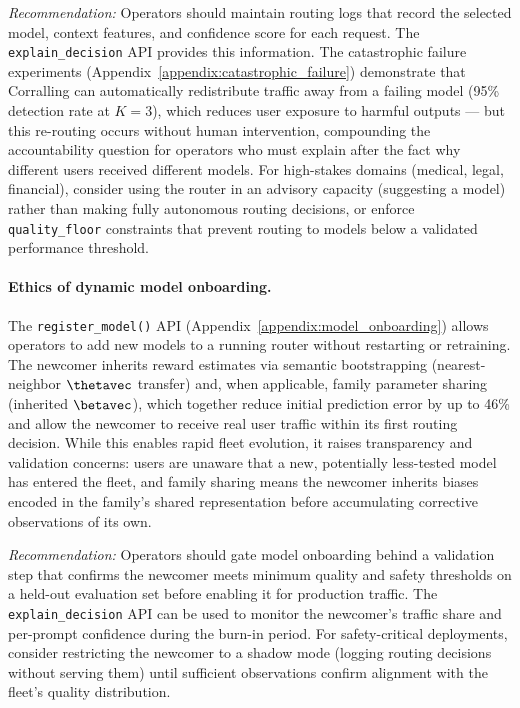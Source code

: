 \emph{Recommendation:}  Operators should maintain routing logs that record
the selected model, context features, and confidence score for each
request.  The \texttt{explain\_decision} API provides this information.
The catastrophic failure experiments
(Appendix~\ref{appendix:catastrophic_failure}) demonstrate that Corralling
can automatically redistribute traffic away from a failing model (95\%
detection rate at $K{=}3$), which reduces user exposure to harmful
outputs --- but this re-routing occurs without human intervention,
compounding the accountability question for operators who must explain
after the fact why different users received different models.
For high-stakes domains (medical, legal, financial), consider using the
router in an advisory capacity (suggesting a model) rather than making
fully autonomous routing decisions, or enforce \texttt{quality\_floor}
constraints that prevent routing to models below a validated performance
threshold.

\paragraph{Ethics of dynamic model onboarding.}
The \texttt{register\_model()} API
(Appendix~\ref{appendix:model_onboarding}) allows operators to add new
models to a running router without restarting or retraining.  The newcomer
inherits reward estimates via semantic bootstrapping (nearest-neighbor
$\thetavec$ transfer) and, when applicable, family parameter sharing
(inherited $\betavec$), which together reduce initial prediction error by
up to 46\% and allow the newcomer to receive real user traffic within its
first routing decision.  While this enables rapid fleet evolution, it
raises transparency and validation concerns: users are unaware that a
new, potentially less-tested model has entered the fleet, and family
sharing means the newcomer inherits biases encoded in the family's shared
representation before accumulating corrective observations of its own.

\emph{Recommendation:}  Operators should gate model onboarding behind a
validation step that confirms the newcomer meets minimum quality and
safety thresholds on a held-out evaluation set before enabling it for
production traffic.  The \texttt{explain\_decision} API can be used to
monitor the newcomer's traffic share and per-prompt confidence during
the burn-in period.  For safety-critical deployments, consider restricting
the newcomer to a shadow mode (logging routing decisions without serving
them) until sufficient observations confirm alignment with the fleet's
quality distribution.

